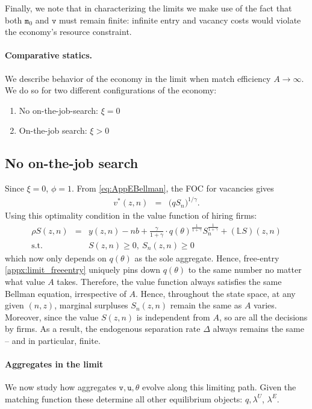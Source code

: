 Finally, we note that in characterizing the limits we make use of the fact that both $\mathtt{m}_{0}$ and $\mathtt{v}$ must remain finite: infinite entry and vacancy costs would violate the economy's resource constraint.

\paragraph{Comparative statics.}
We describe behavior of the economy in the limit when match efficiency $A \to \infty$.
We do so for two different configurations of the economy:
\begin{enumerate}
\item No on-the-job-search: $\xi = 0$
\item On-the-job search: $\xi > 0$
\end{enumerate}


\subsection{No on-the-job search}
Since $\xi=0$, $\phi=1$.
From \eqref{eq:AppEBellman}, the FOC for vacancies gives
\begin{eqnarray}
v^*(z,n) &=&  \Big( q S_n \Big)^{1/\gamma}.\label{appx:optimal_v}
\end{eqnarray}
Using this optimality condition in the value function of hiring firms:
\begin{eqnarray*}
\rho S(z,n) &=& y(z,n) - n b + \frac{\gamma}{1+\gamma} \cdot q(\theta)^{\frac{1}{1+\gamma}} S_n^{\frac{1}{1+\gamma}}+ \left(\mathbb{L} S\right)(z,n) \\
\text{s.t.} && S(z,n) \geq 0  , \ S_n(z,n) \geq 0
\end{eqnarray*}
which now only depends on $q(\theta)$ as the sole aggregate.
Hence, free-entry \eqref{appx:limit_freeentry} uniquely pins down $q(\theta)$ to the same number no matter what value $A$ takes.
Therefore, the value function always satisfies the same Bellman equation, irrespective of $A$.
Hence, throughout the state space, at any given $(n,z)$, marginal surpluses $S_{n}(z,n)$ remain the same as $A$ varies.
Moreover, since the value $S(z,n)$ is independent from $A$, so are all the decisions by firms. As a result, the endogenous separation rate $\Delta$ always remains the same -- and in particular, finite.

\paragraph{Aggregates in the limit}
We now study how aggregates $\mathtt{v,u},\theta $ evolve along this limiting path.
Given the matching function these determine all other equilibrium objects: $q, \lambda^U$, $\lambda^E$.

